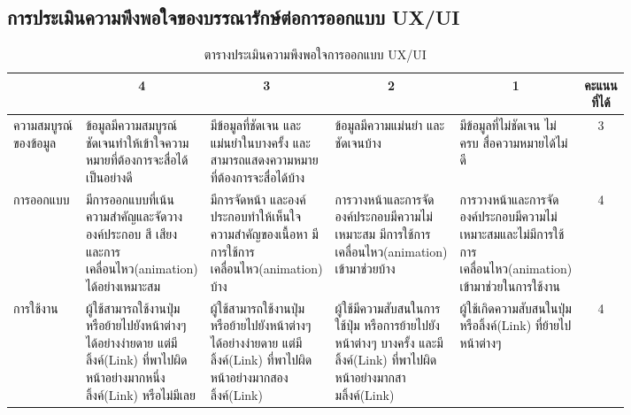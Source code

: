 \subsection{การประเมินความพึงพอใจของบรรณารักษ์ต่อการออกแบบ UX/UI}
\begin{table}[H]
\caption{ตารางประเมินความพึงพอใจการออกแบบ UX/UI}\label{tbl:uxuieva}
\begin{flushleft}
\begin{tabular}{|p{0.13\linewidth}|p{0.17\linewidth}|p{0.17\linewidth}|p{0.17\linewidth}|p{0.17\linewidth}|c|}
    \hline
                        & \multicolumn{1}{c|}{4}                                                                                                 & \multicolumn{1}{c|}{3}                                                                                   & \multicolumn{1}{c|}{2}                                                                                        & \multicolumn{1}{c|}{1}                                                                        & คะแนนที่ได้ \\ \hline
ความสมบูรณ์ของข้อมูล    & ข้อมูลมีความสมบูรณ์   ชัดเจนทำให้เข้าใจความหมายที่ต้องการจะสื่อได้เป็นอย่างดี                                            &  มีข้อมูลที่ชัดเจน   และแม่นยำในบางครั้ง และสามารถแสดงความหมายที่ต้องการจะสื่อได้บ้าง                     &ข้อมูลมีความแม่นยำ   และชัดเจนบ้าง                                                                            & มีข้อมูลที่ไม่ชัดเจน   ไม่ครบ สื่อความหมายได้ไม่ดี                                            & 3           \\ \hline
การออกแบบ           & มีการออกแบบที่เน้นความสำคัญและจัดวางองค์ประกอบ   สี เสียง และการเคลื่อนไหว(animation) ได้อย่างเหมาะสม                            &  มีการจัดหน้า   และองค์ประกอบทำให้เห็นใจความสำคัญของเนื้อหา มีการใช้การเคลื่อนไหว(animation) บ้าง                    & การวางหน้าและการจัดองค์ประกอบมีความไม่เหมาะสม   มีการใช้การเคลื่อนไหว(animation) เข้ามาช่วยบ้าง                               & การวางหน้าและการจัดองค์ประกอบมีความไม่เหมาะสมและไม่มีการใช้  การเคลื่อนไหว(animation) เข้ามาช่วยในการใช้งาน & 4           \\ \hline
การใช้งาน            &  ผู้ใช้สามารถใช้งานปุ่มหรือย้ายไปยังหน้าต่างๆได้อย่างง่ายดาย   แต่มีลิ้งค์(Link) ที่พาไปผิดหน้าอย่างมากหนึ่งลิ้งค์(Link) หรือไม่มีเลย                &  ผู้ใช้สามารถใช้งานปุ่มหรือย้ายไปยังหน้าต่างๆได้อย่างง่ายดาย   แต่มีลิ้งค์(Link) ที่พาไปผิดหน้าอย่างมากสองลิ้งค์(Link)            &ผู้ใช้มีความสับสนในการใช้ปุ่ม   หรือการย้ายไปยังหน้าต่างๆ บางครั้ง และมีลิ้งค์(Link) ที่พาไปผิดหน้าอย่างมากสามลิ้งค์(Link)                      & ผู้ใช้เกิดความสับสนในปุ่มหรือลิ้งค์(Link) ที่ย้ายไปหน้าต่างๆ                                         & 4           \\ \hline

\end{tabular}
\end{flushleft}
\end{table}
